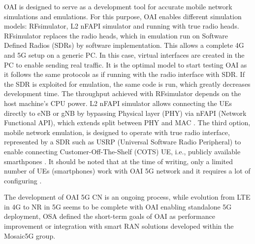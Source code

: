 \documentclass[12pt,a4paper,twoside]{report}
\begin{document}
OAI is designed to serve as a development tool for accurate mobile network simulations and emulations. For this purpose, OAI enables different simulation models: RFsimulator, L2 nFAPI simulator and running with true radio heads. RFsimulator replaces the radio heads, which in emulation run on Software Defined Radios (SDRs) by software implementation. This allows a complete 4G and 5G setup on a generic PC. In this case, virtual interfaces are created in the PC to enable sending real traffic. It is the optimal model to start testing OAI as it follows the same protocols as if running with the radio interface with SDR. If the SDR is exploited for emulation, the same code is run, which greatly decreases development time. The throughput achieved with RFsimulator depends on the host machine’s CPU power. L2 nFAPI simulator allows connecting the UEs directly to eNB or gNB by bypassing Physical layer (PHY) via nFAPI (Network Functional API), which extends split between PHY and MAC \cite{scf-nfapi}. The third option, mobile network emulation, is designed to operate with true radio interface, represented by a SDR such as USRP (Universal Software Radio Peripheral) to enable connecting Customer-Off-The-Shelf (COTS) UE, i.e., publicly available smarthpones \cite{oai_doc}. It should be noted that at the time of writing, only a limited number of UEs (smartphones) work with OAI 5G network and it requires a lot of configuring \cite{oai-maillist}.

The development of OAI 5G CN is an ongoing process, while evolution from LTE in 4G to NR in 5G seems to be complete with OAI enabling standalone 5G deployment, OSA defined the short-term goals of OAI as performance improvement or integration with smart RAN solutions developed within the Mosaic5G group. \cite{oai-mosaic5g-web}
\end{document}
